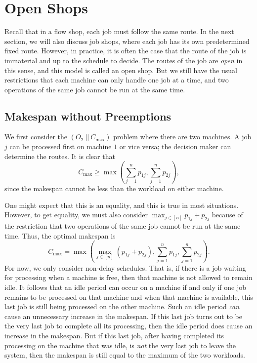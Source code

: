 \section{Open Shops} \label{sec:8}
Recall that in a flow shop, each job must follow the same route. 
In the next section, we will also discuss job shops, where each job has its 
own predetermined fixed route. However, in practice, it is often the case that 
the route of the job is immaterial and up to the schedule to decide. The 
routes of the job are \emph{open} in this sense, and this model is called 
an open shop. But we still have the usual restrictions that each machine 
can only handle one job at a time, and two operations of the same job 
cannot be run at the same time. 

\subsection{Makespan without Preemptions} \label{subsec:8.1}
We first consider the $(O_2~||~C_{\max})$ problem where there are 
two machines. A job $j$ can be processed first on machine $1$ or 
vice versa; the decision maker can determine the routes. It is clear that 
\[ C_{\max} \geq \max\left( \sum_{j=1}^n p_{1j}, \sum_{j=1}^n p_{2j} \right), \] 
since the makespan cannot be less than the workload on either machine. 

One might expect that this is an equality, and this is true 
in most situations. However, to get equality, we must also consider 
$\max_{j\in[n]} p_{1j} + p_{2j}$ because of the restriction 
that two operations of the same job cannot be run at the same time. 
Thus, the optimal makespan is 
\[ C_{\max} = \max\left( \max_{j\in[n]} (p_{1j} + p_{2j}), 
\sum_{j=1}^n p_{1j}, \sum_{j=1}^n p_{2j} \right). \] 
For now, we only consider non-delay schedules. That is, if there is a job 
waiting for processing when a machine is free, then that machine is 
not allowed to remain idle. It follows that an idle period can occur 
on a machine if and only if one job remains to be processed on that machine 
and when that machine is available, this last job is still being processed 
on the other machine. Such an idle period \emph{can} cause an unnecessary 
increase in the makespan. If this last job turns out to be the very last 
job to complete all its processing, then the idle period does cause 
an increase in the makespan. But if this last job, after having 
completed its processing on the machine that was idle, is \emph{not} 
the very last job to leave the system, then the makespan is still 
equal to the maximum of the two workloads. 

